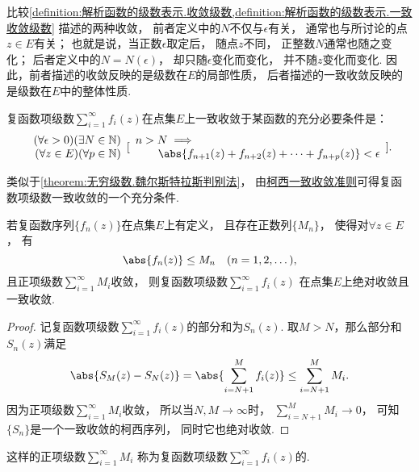 比较\cref{definition:解析函数的级数表示.收敛级数,definition:解析函数的级数表示.一致收敛级数} 描述的两种收敛，
前者定义中的\(N\)不仅与\(\epsilon\)有关，
通常也与所讨论的点\(z \in E\)有关；
也就是说，当正数\(\epsilon\)取定后，
随点\(z\)不同，
正整数\(N\)通常也随之变化；
后者定义中的\(N = N(\epsilon)\)，
却只随\(\epsilon\)变化而变化，
并不随\(z\)变化而变化.
因此，前者描述的收敛反映的是级数在\(E\)的局部性质，
后者描述的一致收敛反映的是级数在\(E\)中的整体性质.

\begin{theorem}[柯西一致收敛准则]\label{theorem:无穷级数.柯西一致收敛准则}
复函数项级数\(\sum_{i=1}^\infty f_i(z)\)在点集\(E\)上一致收敛于某函数的充分必要条件是：\begin{equation*}
	\begin{array}{r}
		(\forall\epsilon>0)
		(\exists N \in \mathbb{N}) \\
		(\forall z \in E)
		(\forall p \in \mathbb{N})
	\end{array}
	[
		\begin{array}{l}
			n > N \implies \\
			\hspace{20pt}
			\abs{f_{n+1}(z) + f_{n+2}(z) + \dotsb + f_{n+p}(z)} < \epsilon
		\end{array}
	].
\end{equation*}
\end{theorem}

类似于\cref{theorem:无穷级数.魏尔斯特拉斯判别法}，
由\hyperref[theorem:无穷级数.柯西一致收敛准则]{柯西一致收敛准则}可得复函数项级数一致收敛的一个充分条件.
\begin{corollary}\label{theorem:无穷级数.优级数准则}
若复函数序列\(\{f_n(z)\}\)在点集\(E\)上有定义，
且存在正数列\(\{M_n\}\)，
使得对\(\forall z \in E\)，
有\begin{equation*}
	\abs{f_n(z)} \leq M_n
	\quad(n=1,2,\dotsc),
\end{equation*}
且正项级数\(\sum_{i=1}^\infty M_i\)收敛，
则复函数项级数\(\sum_{i=1}^\infty f_i(z)\)
在点集\(E\)上绝对收敛且一致收敛.
\begin{proof}
记复函数项级数\(\sum_{i=1}^\infty f_i(z)\)的部分和为\(S_n(z)\).
取\(M > N\)，那么部分和\(S_n(z)\)满足\begin{equation*}
	\abs{S_M(z) - S_N(z)}
	= \abs{\sum_{i=N+1}^M f_i(z)}
	\leq \sum_{i=N+1}^M M_i.
\end{equation*}
因为正项级数\(\sum_{i=1}^\infty M_i\)收敛，
所以当\(N,M \to \infty\)时，
\(\sum_{i=N+1}^M M_i \to 0\)，
可知\(\{S_n\}\)是一个一致收敛的柯西序列，
同时它也绝对收敛.
\end{proof}
\end{corollary}
这样的正项级数\(\sum_{i=1}^\infty M_i\)
称为复函数项级数\(\sum_{i=1}^\infty f_i(z)\)的.

